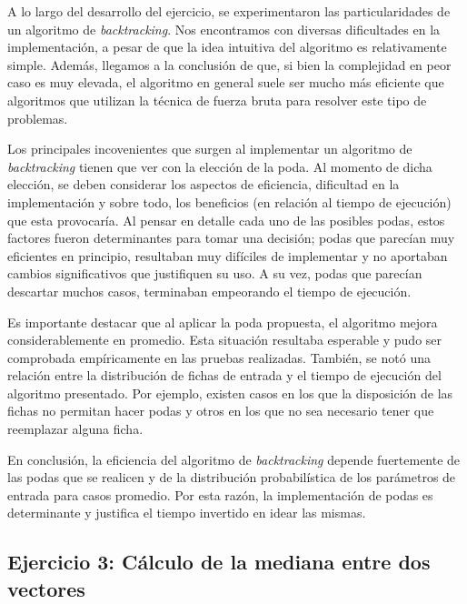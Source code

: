\documentclass[a4paper,11pt] {article}
\begin{document}
A lo largo del desarrollo del ejercicio, se experimentaron las particularidades de un algoritmo de \textit{backtracking}. Nos encontramos con diversas dificultades en la implementaci\'on, a pesar de que la idea intuitiva del algoritmo es relativamente simple. Adem\'as, llegamos a la conclusi\'on de que, si bien la complejidad en peor caso es muy elevada, el algoritmo en general suele ser mucho m\'as eficiente que algoritmos que utilizan la t\'ecnica de fuerza bruta para resolver este tipo de problemas. 

Los principales incovenientes que surgen al implementar un algoritmo de \textit{backtracking} tienen que ver con la elecci\'on de la poda. Al momento de dicha elecci\'on, se deben considerar los aspectos de eficiencia, dificultad en la implementaci\'on y sobre todo, los beneficios (en relaci\'on al tiempo de ejecuci\'on) que esta provocar\'ia. Al pensar en detalle cada uno de las posibles podas, estos factores fueron determinantes para tomar una decisi\'on; podas que parec\'ian muy eficientes en principio, resultaban muy dif\'iciles de implementar y no aportaban cambios significativos que justifiquen su uso. A su vez, podas que parec\'ian descartar muchos casos, terminaban empeorando el tiempo de ejecuci\'on.

Es importante destacar que al aplicar la poda propuesta, el algoritmo mejora considerablemente en promedio. Esta situaci\'on resultaba esperable y pudo ser comprobada emp\'iricamente en las pruebas realizadas. Tambi\'en, se not\'o una relaci\'on entre la distribuci\'on de fichas de entrada y el tiempo de ejecuci\'on del algoritmo presentado. Por ejemplo, existen casos en los que la disposici\'on de las fichas no permitan hacer podas y otros en los que no sea necesario tener que reemplazar alguna ficha.

En conclusi\'on, la eficiencia del algoritmo de \textit{backtracking} depende fuertemente de las podas que se realicen y de la distribuci\'on probabil\'istica de los par\'ametros de entrada para casos promedio. Por esta raz\'on, la implementaci\'on de podas es determinante y justifica el tiempo invertido en idear las mismas.

\begin{center}
\section*{Ejercicio 3: C\'alculo de la mediana entre dos vectores}
\end{center}
\end{document}
